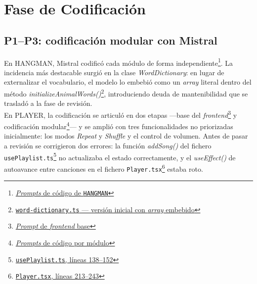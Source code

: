\section{Fase de Codificación} \label{sec:dev-coding}

\subsection{P1--P3: codificación modular con Mistral}

En \ac{HANGMAN}, Mistral codificó cada módulo de forma independiente\footnote{\href{https://github.com/alu0101549491/TFG-Fabian-Gonzalez-Lence/tree/main/resources/prompts/1-TheHangmanGame/3-CodigoPorModulo}{\textit{Prompts} de código de \texttt{HANGMAN}}}. La incidencia más destacable surgió en la clase \textit{WordDictionary}: en lugar de externalizar el vocabulario, el modelo lo embebió como un \textit{array} literal dentro del método \textit{initializeAnimalWords()}\footnote{\href{https://github.com/alu0101549491/TFG-Fabian-Gonzalez-Lence/blob/6ade2d937c5fc8507893551a8f82d8d46e6fcbb2/projects/1-TheHangmanGame/src/models/word-dictionary.ts\#L46-L54}{\texttt{word-dictionary.ts} — versión inicial con \textit{array} embebido}}, introduciendo deuda de mantenibilidad que se trasladó a la fase de revisión.\\

En \ac{PLAYER}, la codificación se articuló en dos etapas ---base del \textit{frontend}\footnote{\href{https://github.com/alu0101549491/TFG-Fabian-Gonzalez-Lence/blob/main/resources/prompts/2-MusicWebPlayer/2-CodigoFrontend/frontend.prompt.md}{\textit{Prompt} de \textit{frontend} base}} y codificación modular\footnote{\href{https://github.com/alu0101549491/TFG-Fabian-Gonzalez-Lence/tree/main/resources/prompts/2-MusicWebPlayer/3-CodigoPorModulo}{\textit{Prompts} de código por módulo}}--- y se amplió con tres funcionalidades no priorizadas inicialmente: los modos \textit{Repeat} y \textit{Shuffle} y el control de volumen. Antes de pasar a revisión se corrigieron dos errores: la función \textit{addSong()} del fichero \texttt{usePlaylist.ts}\footnote{\href{https://github.com/alu0101549491/TFG-Fabian-Gonzalez-Lence/blob/main/projects/2-MusicWebPlayer/src/hooks/usePlaylist.ts\#L138-L152}{\texttt{usePlaylist.ts}, líneas 138--152}} no actualizaba el estado correctamente, y el \textit{useEffect()} de autoavance entre canciones en el fichero \texttt{Player.tsx}\footnote{\href{https://github.com/alu0101549491/TFG-Fabian-Gonzalez-Lence/blob/main/projects/2-MusicWebPlayer/src/components/Player.tsx\#L213-L243}{\texttt{Player.tsx}, líneas 213--243}} estaba roto.\\

